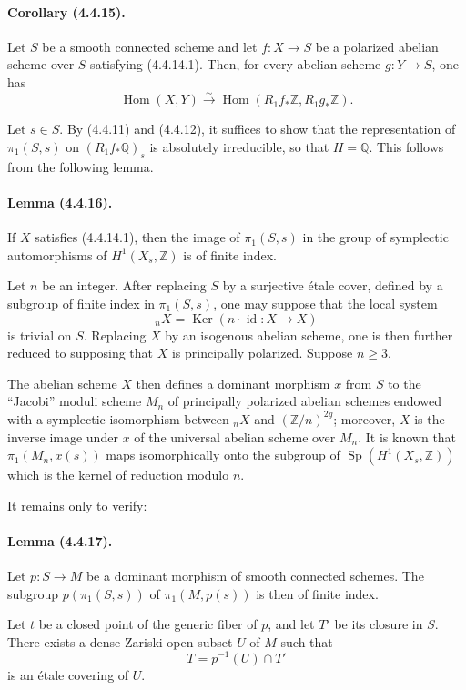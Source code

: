 \documentclass[10pt]{article}
\newcommand{\Q}{\mathbb Q}
\newcommand{\Z}{\mathbb Z}
\newcommand{\Ker}{\operatorname{Ker}}
\newcommand{\Hom}{\operatorname{Hom}}
\newcommand{\iso}{\xrightarrow{\sim}}
\providecommand{\Sp}{\operatorname{Sp}}
\begin{document}
\paragraph{Corollary (4.4.15).} Let $S$ be a smooth connected scheme and let $f:X\to S$ be a polarized abelian scheme over $S$ satisfying (4.4.14.1). Then, for every abelian scheme $g:Y\to S$, one has
\[
\Hom(X,Y)\iso\Hom(R_1f_*\Z,R_1g_*\Z).
\]

Let $s\in S$. By (4.4.11) and (4.4.12), it suffices to show that the representation of $\pi_1(S,s)$ on $(R_1f_*\Q)_s$ is absolutely irreducible, so that $H=\Q$. This follows from the following lemma.

\paragraph{Lemma (4.4.16).} If $X$ satisfies (4.4.14.1), then the image of $\pi_1(S,s)$ in the group of symplectic automorphisms of $H^1(X_s,\Z)$ is of finite index.

Let $n$ be an integer. After replacing $S$ by a surjective étale cover, defined by a subgroup of finite index in $\pi_1(S,s)$, one may suppose that the local system
\[
{}_nX=\Ker(n\cdot \operatorname{id}:X\to X)
\]
is trivial on $S$. Replacing $X$ by an isogenous abelian scheme, one is then further reduced to supposing that $X$ is principally polarized. Suppose $n\ge3$.

The abelian scheme $X$ then defines a dominant morphism $x$ from $S$ to the ``Jacobi'' moduli scheme $M_n$ of principally polarized abelian schemes endowed with a symplectic isomorphism between ${}_nX$ and $(\Z/n)^{2g}$; moreover, $X$ is the inverse image under $x$ of the universal abelian scheme over $M_n$. It is known that $\pi_1(M_n,x(s))$ maps isomorphically onto the subgroup of $\Sp(H^1(X_s,\Z))$ which is the kernel of reduction modulo $n$.

It remains only to verify:

\paragraph{Lemma (4.4.17).} Let $p:S\to M$ be a dominant morphism of smooth connected schemes. The subgroup $p(\pi_1(S,s))$ of $\pi_1(M,p(s))$ is then of finite index.

Let $t$ be a closed point of the generic fiber of $p$, and let $T'$ be its closure in $S$. There exists a dense Zariski open subset $U$ of $M$ such that
\[
T=p^{-1}(U)\cap T'
\]
is an étale covering of $U$.
\end{document}
